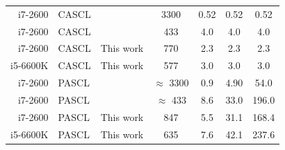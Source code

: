 \documentclass[11pt]{report}
\begin{document}
\begin{table}[hb!]
{{\begin{tabular}{r|l|c|c|c c c}
        \hline
        i7-2600                          & CASCL                                                                                     & ~\cite{Sarkis2014a}               & 3300                                              & 0.52                                            & 0.52            & 0.52            \\
        i7-2600                          & CASCL                                                                                     & ~\cite{Sarkis2016}                & 433                                               & 4.0                                             & 4.0             & 4.0             \\
        i7-2600                          & CASCL                                                                                     & This work                         & 770                                               & 2.3                                             & 2.3             & 2.3             \\
        i5-6600K                         & CASCL                                                                                     & This work                         & 577                                               & 3.0                                             & 3.0             & 3.0             \\
        \hline
        i7-2600                          & PASCL                                                                                     & ~\cite{Sarkis2014a}               & $\approx$ 3300                                    & 0.9                                             & 4.90            & 54.0            \\
        i7-2600                          & PASCL                                                                                     & ~\cite{Sarkis2016}                & $\approx$ 433                                     & 8.6                                             & 33.0            & 196.0           \\
        i7-2600                          & PASCL                                                                                     & This work                         & 847                                               & 5.5                                             & 31.1            & 168.4           \\
        i5-6600K                         & PASCL                                                                                     & This work                         & 635                                               & 7.6                                             & 42.1            & 237.6           \\

\end{tabular}}}
\end{table}
\end{document}
